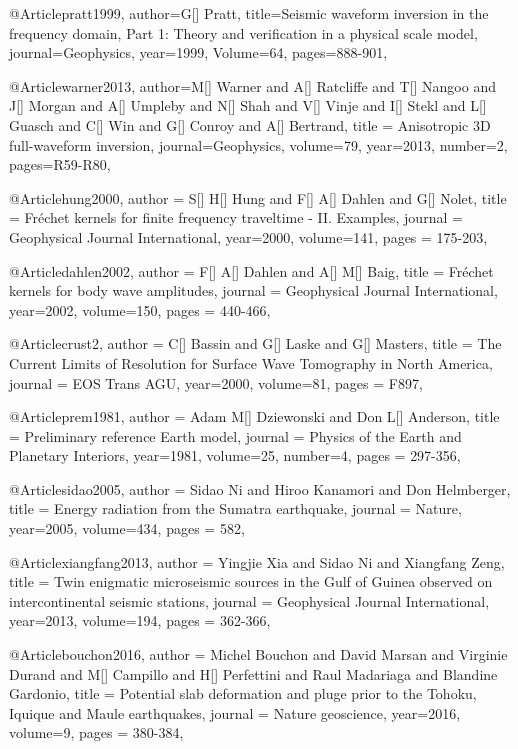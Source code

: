 @Article{pratt1999,
  author={G[] Pratt},
  title={Seismic waveform inversion in the frequency domain, {P}art 1: {T}heory and verification in a physical scale model},
  journal={Geophysics},
  year=1999,
  Volume=64,
  pages={888-901},
}

@Article{warner2013,
  author={M[] Warner and A[] Ratcliffe and T[] Nangoo and J[] Morgan and A[] Umpleby and N[] Shah and V[] Vinje and I[] Stekl and L[] Guasch and C[] Win and G[] Conroy and A[] Bertrand},
  title = {Anisotropic 3{D} full-waveform inversion},
  journal={Geophysics},
  volume=79,
  year=2013,
  number=2,
  pages={R59-R80},
}

@Article{hung2000,
  author =	 {S[] H[] Hung and F[] A[] Dahlen and G[] Nolet},
  title =	 {Fr\'{e}chet kernels for finite frequency traveltime - {II}. Examples},
  journal =	 {Geophysical Journal International},
  year=2000,
  volume=141,
  pages =	 {175-203},
}


@Article{dahlen2002,
  author =	 {F[] A[] Dahlen and A[] M[] Baig},
  title =	 {Fr\'{e}chet kernels for body wave amplitudes},
  journal =	 {Geophysical Journal International},
  year=2002,
  volume=150,
  pages =	 {440-466},
}


@Article{crust2,
  author =	 {C[] Bassin and G[] Laske and G[] Masters},
  title =	 {The Current Limits of Resolution for Surface Wave Tomography in North America},
  journal =	 {EOS Trans AGU},
  year=2000,
  volume=81,
  pages =	 {F897},
}

@Article{prem1981,
  author =	 {Adam M[] Dziewonski and Don L[] Anderson},
  title =	 {Preliminary reference Earth model},
  journal =	 {Physics of the Earth and Planetary Interiors},
  year=1981,
  volume=25,
  number=4,
  pages =	 {297-356},
}



@Article{sidao2005,
  author =	 {Sidao Ni and Hiroo Kanamori and Don Helmberger},
  title =	 {Energy radiation from the Sumatra earthquake},
  journal =	 {Nature},
  year=2005,
  volume=434,
  pages =	 {582},
}

@Article{xiangfang2013,
  author =	 {Yingjie Xia and Sidao Ni and Xiangfang Zeng},
  title =	 {Twin enigmatic microseismic sources in the Gulf of Guinea observed on intercontinental seismic stations},
  journal =	 {Geophysical Journal International},
  year=2013,
  volume=194,
  pages =	 {362-366},
}

@Article{bouchon2016,
  author =	 {Michel Bouchon and David Marsan and Virginie Durand and M[] Campillo and H[] Perfettini and Raul Madariaga and Blandine Gardonio},
  title =	 {Potential slab deformation and pluge prior to the {T}ohoku, {I}quique and {M}aule earthquakes},
  journal =	 {Nature geoscience},
  year=2016,
  volume=9,
  pages =	 {380-384},
}

